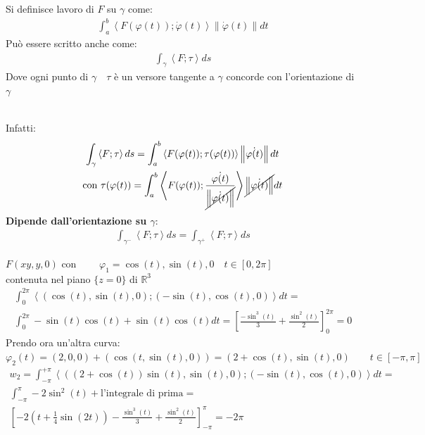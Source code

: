 \documentclass[a4paper, oneside]{article}
\begin{document}
\begin{definition}
    Si definisce lavoro di $F$ su $\gamma$ come:
    \begin{gather*}
        \int_{a}^{b} \left\langle F(\varphi(t));\dot{\varphi}(t) \right\rangle \left\lVert \dot{\varphi}(t) \right\rVert dt
    \end{gather*}
    Può essere scritto anche come:
    \begin{gather*}
        \int_{\gamma} \left\langle F;\tau \right\rangle ds 
    \end{gather*}
    Dove ogni punto di $\gamma \quad \tau$ è un versore tangente a $\gamma$ concorde con l'orientazione di $\gamma$ 
\end{definition}
\hfil\\
Infatti:
\begin{gather*}
    \int_{\gamma} \left\langle F ; \tau\right\rangle ds = \int_{a}^{b} \left\langle F(\varphi(t)); \tau(\varphi(t)) \right\rangle \left\lVert \dot{\varphi(t)} \right\rVert dt\\
    \text{con } \tau(\varphi(t)) = \int_{a}^{b} \left\langle F(\varphi(t)); \frac{\dot{\varphi(t)}}{\cancel{\left\lVert \dot{\varphi(t)} \right\rVert}} \right\rangle \cancel{\left\lVert \dot{\varphi(t)} \right\rVert} dt
\end{gather*}
\textbf{Dipende dall'orientazione su $\gamma$}:
\begin{gather*}
    \int_{\gamma^-} \left\langle F; \tau \right\rangle ds = \int_{\gamma^+} \left\langle F; \tau\right\rangle ds 
\end{gather*}
\begin{example}
    $F(xy,y,0)$ con $\qquad \varphi_1 = \cos(t),\sin(t),0 \quad t \in [0,2\pi]$\\
    contenuta nel piano $\{ z = 0 \}$ di $\mathbb{R}^3$
    \begin{gather*}
        \int_{0}^{2 \pi} \left\langle (\cos(t),\sin(t),0);(-\sin(t),\cos(t),0) \right\rangle dt =\\
        \int_{0}^{2\pi} -\sin(t) \cos(t) +\sin(t) \cos(t) dt = \left[ \frac{-\sin^3(t)}{3} + \frac{\sin^2(t)}{2} \right]_0^{2\pi} = 0 
    \end{gather*}
    Prendo ora un'altra curva: $\varphi_2(t)= (2,0,0) + (\cos(t,\sin(t),0)) = (2+\cos(t),\sin(t),0) \qquad t \in [-\pi,\pi]$
    \begin{gather*}
        w_2 = \int_{-\pi}^{+\pi} \left\langle ((2+\cos(t))\sin(t),\sin(t),0);(-\sin(t),\cos(t),0) \right\rangle dt =\\
        \int_{-\pi}^{\pi} -2\sin^2(t) + \text{l'integrale di prima} =\\
        \left[ -2(t+\frac{1}{4}\sin(2t)) - \frac{\sin^3(t)}{3} + \frac{\sin^2(t)}{2} \right]_{-\pi}^{\pi} = -2\pi  
    \end{gather*}
\end{example}
\end{document}
